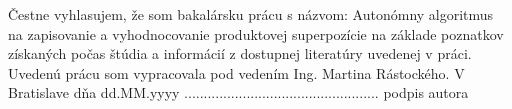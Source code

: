 Čestne vyhlasujem, že som bakalársku prácu s názvom: Autonómny algoritmus na zapisovanie a vyhodnocovanie produktovej superpozície na základe poznatkov získaných počas štúdia a informácií z dostupnej literatúry uvedenej v práci.
Uvedenú prácu som  vypracovala pod vedením  Ing. Martina Rástockého.
\newline
\newline
V Bratislave dňa  dd.MM.yyyy
\newline
\newline
\newline
\newline
..................................................
\newline
podpis autora
